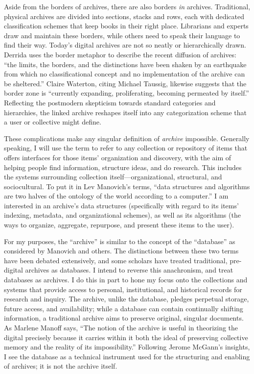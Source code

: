 Aside from the borders of archives, there are also borders \emph{in} archives. Traditional, physical archives are divided into sections, stacks and rows, each with dedicated classification schemes that keep books in their right place. Librarians and experts draw and maintain these borders, while others need to speak their language to find their way. Today's digital archives are not so neatly or hierarchically drawn. Derrida uses the border metaphor to describe the recent diffusion of archives: ``the limits, the borders, and the distinctions have been shaken by an earthquake from which no classificational concept and no implementation of the archive can be sheltered.''\autocite[11]{derrida_archive_1995} Claire Waterton, citing Michael Taussig, likewise suggests that the border zone is ``currently expanding, proliferating, becoming permeated by itself.''\autocite[649]{waterton_experimenting_2010} Reflecting the postmodern skepticism towards standard categories and hierarchies, the linked archive reshapes itself into any categorization scheme that a user or collective might define.

These complications make any singular definition of \emph{archive} impossible. Generally speaking, I will use the term to refer to any collection or repository of items that offers interfaces for those items' organization and discovery, with the aim of helping people find information, structure ideas, and do research. This includes the systems surrounding collection itself---organizational, structural, and sociocultural. To put it in Lev Manovich's terms, ``data structures and algorithms are two halves of the ontology of the world according to a computer.''\autocite[84]{manovich_database_1999} I am interested in an archive's data structures (specifically with regard to its items' indexing, metadata, and organizational schemes), as well as its algorithms (the ways to organize, aggregate, repurpose, and present these items to the user).

For my purposes, the ``archive'' is similar to the concept of the ``database'' as considered by Manovich and others. The distinctions between these two terms have been debated extensively, and some scholars have treated traditional, pre-digital archives as databases.\autocite[See, e.g.,][]{manoff_archive_2010,freedman_responses_2007,barnet_pack-rat_2001} I intend to reverse this anachronism, and treat databases as archives. I do this in part to hone my focus onto the collections and systems that provide access to personal, institutional, and historical records for research and inquiry. The archive, unlike the database, pledges perpetual storage, future access, and availability; while a database can contain continually shifting information, a traditional archive aims to preserve original, singular documents. As Marlene Manoff says, ``The notion of the archive is useful in theorizing the digital precisely because it carries within it both the ideal of preserving collective memory and the reality of its impossibility.''\autocite[396]{manoff_archive_2010} Following Jerome McGann's insights, I see the database as a technical instrument used for the structuring and enabling of archives; it is not the archive itself.\autocite[1588]{freedman_responses_2007}

